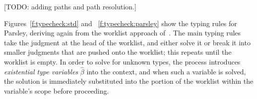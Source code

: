\documentclass[letterpaper]{article}
\newcommand{\todo}[1]{{\color{red}[TODO: #1]}}
\newcommand{\etv}{\widehat{\beta}}    %
\begin{document}
\todo{adding paths and path resolution.}

Figures~\ref{f:typecheck:std} and ~\ref{f:typecheck:parsley} show the
typing rules for Parsley, deriving again from the worklist approach
of~\cite{zhao2018,zhao19:bidir}.  The main typing rules take the
judgment at the head of the worklist, and either solve it or break it
into smaller judgments that are pushed onto the worklist; this repeats
until the worklist is empty.  In order to solve for unknown types, the
process introduces {\em existential type variables} $\etv$ into the
context, and when such a variable is solved, the solution is
immediately substituted into the portion of the worklist within the
variable's scope before proceeding.

\newcommand\rstep[1]{~\longrightarrow_{\makebox[0pt][l]{$\scriptstyle #1$}\phantom{~~}}}
\newcommand\typrule{\stepcounter{ruleCounter}\rstep{\arabic{ruleCounter}}}
\end{document}
